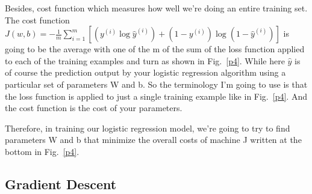\documentclass[a4paper]{article}
\begin{document}
Besides, cost function which measures how well we're doing an entire training set. The cost function $J(w,b)=-\frac{1}{m}\sum_{i=1}^{m}[(y^{(i)}\log \hat{y}^{(i)})+(1-y^{(i)})\log(1-\hat{y}^{(i)})]$ is going to be the average with one of the m of the sum of the loss function applied to each of the training examples and turn as shown in Fig.~\ref{p4}. While here $\hat{y}$ is of course the prediction output by your logistic regression algorithm using a particular set of parameters W and b. So the terminology I'm going to use is that the loss function is applied to just a single training example like in Fig.~\ref{p4}. And the cost function is the cost of your parameters. 

Therefore, in training our logistic regression model, we're going to try to find parameters W and b that minimize the overall costs of machine J written at the bottom in Fig.~\ref{p4}.

\subsection{Gradient Descent}
\end{document}

